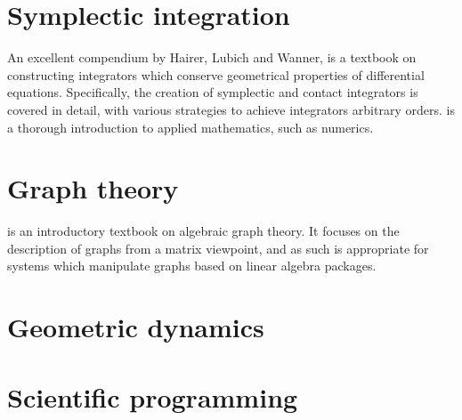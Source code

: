 \documentclass[utf8,a4paper,12pt]{report}
\begin{document}
\section{Symplectic integration}
An excellent compendium by Hairer, Lubich and Wanner, \cite{Hairer} is a textbook on constructing integrators which conserve geometrical properties of differential equations. Specifically, the creation of symplectic and contact integrators is covered in detail, with various strategies to achieve integrators arbitrary orders. \cite{Holmes2009} is a thorough introduction to applied mathematics, such as numerics.
\section{Graph theory}
\cite{Knauer2011} is an introductory textbook on algebraic graph theory. It focuses on the description of graphs from a matrix viewpoint, and as such is appropriate for systems which manipulate graphs based on linear algebra packages.
\section{Geometric dynamics}
\section{Scientific programming}



\nocite{*}
\end{document}
